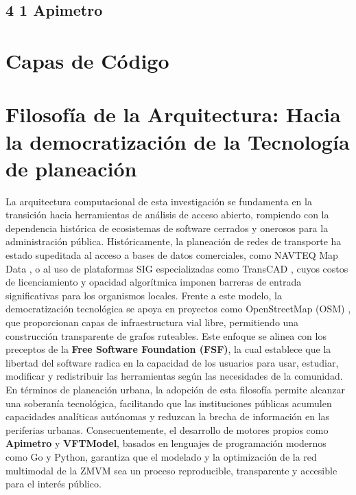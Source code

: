 \subsection*{4 1 Apimetro}
\section*{Capas de Código}
\label{ch:Capas-codigo}

\section{Filosofía de la Arquitectura: Hacia la democratización de la Tecnología de planeación}
\label{sec:filosofia-arquitectura}
La arquitectura computacional de esta investigación se fundamenta en la transición hacia herramientas de análisis de acceso abierto, 
rompiendo con la dependencia histórica de ecosistemas de software cerrados y onerosos para la administración pública. 
Históricamente, la planeación de redes de transporte ha estado supeditada al acceso a bases de datos comerciales, como NAVTEQ Map Data 
\parencite{navteq2012}, o al uso de plataformas SIG especializadas como TransCAD \parencite{caliper2010}, cuyos costos de licenciamiento y opacidad 
algorítmica imponen barreras de entrada significativas para los organismos locales.
Frente a este modelo, la democratización tecnológica se apoya en proyectos como OpenStreetMap (OSM) \parencite{osm2012}, que proporcionan capas 
de infraestructura vial libre, permitiendo una construcción transparente de grafos ruteables. Este enfoque se alinea con los preceptos de la \textbf{Free Software Foundation (FSF)}, 
la cual establece que la libertad del software radica en la capacidad de los usuarios para usar, estudiar, modificar y redistribuir las herramientas según las necesidades de la comunidad.
En términos de planeación urbana, la adopción de esta filosofía permite alcanzar una soberanía tecnológica, facilitando que las instituciones públicas acumulen capacidades analíticas autónomas 
y reduzcan la brecha de información en las periferias urbanas. Consecuentemente, el desarrollo de motores propios como \textbf{Apimetro} y \textbf{VFTModel}, basados en lenguajes de programación modernos como Go y Python, 
garantiza que el modelado y la optimización de la red multimodal de la ZMVM sea un proceso reproducible, transparente y accesible para el interés público.
\DIFaddbegin 

